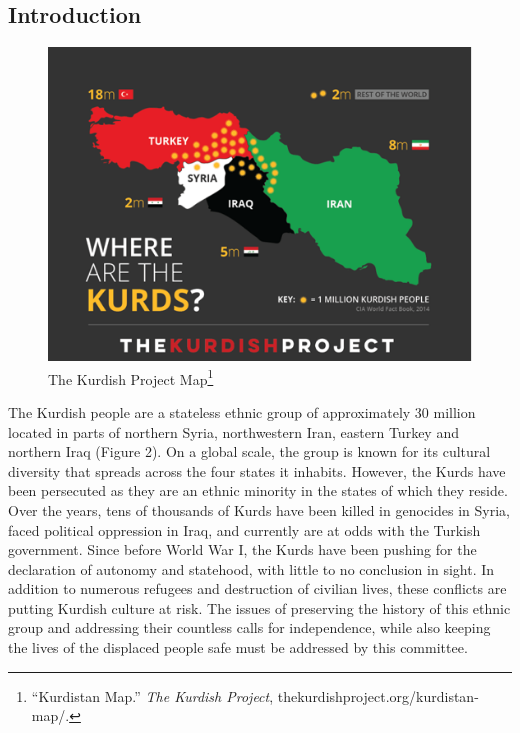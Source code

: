 \documentclass[10pt, letterpaper]{article}
\begin{document}
\subsection{Introduction} 
\begin{figure}
\centering
\includegraphics[scale = 0.75]{Picture2.png} 
\caption{The Kurdish Project Map\footnote{``Kurdistan Map.'' \emph{The Kurdish Project},
  thekurdishproject.org/kurdistan-map/.}}
\end{figure}


The Kurdish people are a stateless ethnic group of approximately 30
million located in parts of northern Syria, northwestern Iran, eastern
Turkey and northern Iraq (Figure 2). On a global scale, the group is
known for its cultural diversity that spreads across the four states it
inhabits. However, the Kurds have been persecuted as they are an ethnic
minority in the states of which they reside. Over the years, tens of
thousands of Kurds have been killed in genocides in Syria, faced
political oppression in Iraq, and currently are at odds with the Turkish
government. Since before World War I, the Kurds have been pushing for
the declaration of autonomy and statehood, with little to no conclusion
in sight. In addition to numerous refugees and destruction of civilian
lives, these conflicts are putting Kurdish culture at risk. The issues
of preserving the history of this ethnic group and addressing their
countless calls for independence, while also keeping the lives of the
displaced people safe must be addressed by this committee. \\
\end{document}
